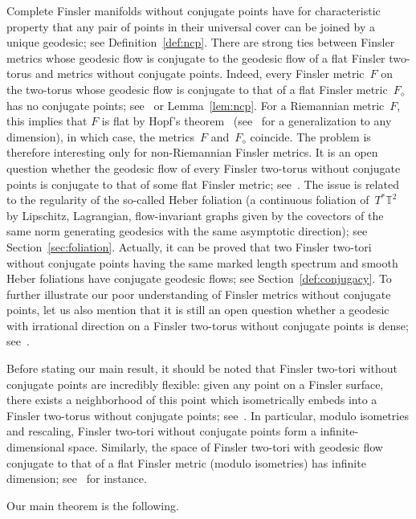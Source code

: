 \documentclass[AHL,Unicode,longabstracts,published]{cedram}
\newcommand{\T}{\mathbb{T}}
\begin{document}
Complete Finsler manifolds without conjugate points have for characteristic property that any pair of points in their universal cover can be joined by a unique geodesic; see Definition~\ref{def:ncp}. There are strong ties between Finsler metrics whose geodesic flow is conjugate to the geodesic flow of a flat Finsler two-torus and metrics without conjugate points. Indeed, every Finsler metric~$F$ on the two-torus whose geodesic flow is conjugate to that of a flat Finsler metric~$F_\diamond$ has no conjugate points; see~\cite{cro90} or Lemma~\ref{lem:ncp}. For a Riemannian metric~$F$, this implies that $F$ is flat by Hopf's theorem~\cite{Ho48} (see~\cite{BI94} for a generalization to any dimension), in which case, the metrics~$F$ and~$F_\diamond$ coincide. The problem is therefore interesting only for non-Riemannian Finsler metrics. It is an open question whether the geodesic flow of every Finsler two-torus without conjugate points is conjugate to that of some flat Finsler metric; see~\cite{BC21,CK94}. The issue is related to the regularity of the so-called Heber foliation (a continuous foliation of~$T^*\T^2$ by Lipschitz, Lagrangian, flow-invariant graphs given by the covectors of the same norm generating geodesics with the same asymptotic direction); see Section~\ref{sec:foliation}. Actually, it can be proved that two Finsler two-tori without conjugate points having the same marked length spectrum and smooth Heber foliations have conjugate geodesic flows; see Section~\ref{def:conjugacy}. To further illustrate our poor understanding of Finsler metrics without conjugate points, let us also mention that it is still an open question whether a geodesic with irrational direction on a Finsler two-torus without conjugate points is dense; see~\cite{BC21}.


Before stating our main result, it should be noted that Finsler two-tori without conjugate points are incredibly flexible: given any point on a Finsler surface, there exists a neighborhood of this point which isometrically embeds into a Finsler two-torus without conjugate points; see~\cite{Ch19}. In particular, modulo isometries and rescaling, Finsler two-tori without conjugate points form a infinite-dimensional space. Similarly, the space of Finsler two-tori with geodesic flow conjugate to that of a flat Finsler metric (modulo isometries) has infinite dimension; see~\cite[Appendix]{Sa19} for instance.

Our main theorem is the following.
\end{document}
